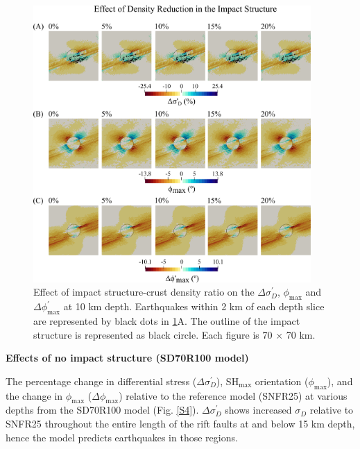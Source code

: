 \documentclass[draft,jgrga]{agutexSI2019}
\begin{document}
\begin{article}
\begin{figure}[ht]
\includegraphics[width=25pc]{Figures/effect_of_density.png}
\caption{Effect of impact structure-crust density ratio on the $\Delta\sigma_{D}^{\prime}$, $\phi_{\max}$ and $\Delta \phi_{\max}^{\prime}$ at 10 km depth. Earthquakes within 2 km of each depth slice are represented by black dots in \ref{S3}A. The outline of the impact structure is represented as black circle. Each figure is 70 $\times$ 70 km.}
\label{S3}
\end{figure}

\vspace{10mm} %


\noindent\textbf{Effects of no impact structure (SD70R100 model)}

The percentage change in differential stress ($\Delta\sigma_{D}^{\prime}$), SH$_{\max}$ orientation ($\phi_{\max}$), and the change in $\phi_{\max}$ ($\Delta\phi_{\max}$) relative to the reference model (SNFR25) at various depths from the SD70R100 model (Fig. \ref{S4}).  $\Delta\sigma_{D}^{\prime}$ shows increased $\sigma_{D}$ relative to SNFR25 throughout the entire length of the rift faults at and below 15 km depth, hence the model predicts earthquakes in those regions. 

\vspace{10mm} %


\end{article}
\end{document}
